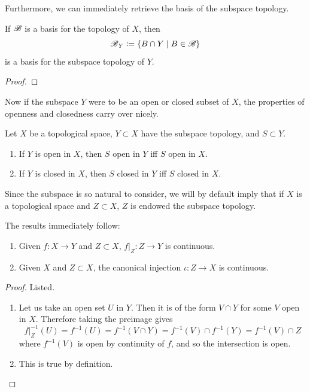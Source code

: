   Furthermore, we can immediately retrieve the basis of the subspace topology. 

  \begin{theorem}
    If $\B$ is a basis for the topology of $X$, then 
    \begin{equation}
      \B_Y \coloneqq \{B \cap Y \mid B \in \B \} 
    \end{equation}
    is a basis for the subspace topology of $Y$. 
  \end{theorem}
  \begin{proof}
    
  \end{proof} 

  Now if the subspace $Y$ were to be an open or closed subset of $X$, the properties of openness and closedness carry over nicely. 

  \begin{lemma}
    Let $X$ be a topological space, $Y \subset X$ have the subspace topology, and $S \subset Y$. 
    \begin{enumerate}
      \item If $Y$ is open in $X$, then $S$ open in $Y$ iff $S$ open in $X$. 
      \item If $Y$ is closed in $X$, then $S$ closed in $Y$ iff $S$ closed in $X$. 
    \end{enumerate}
  \end{lemma}

  Since the subspace is so natural to consider, we will by default imply that if $X$ is a topological space and $Z \subset X$, $Z$ is endowed the subspace topology. 

  \begin{lemma}
    The results immediately follow: 
    \begin{enumerate}
      \item Given $f: X \rightarrow Y$ and $Z \subset X$, $f|_{Z} : Z \rightarrow Y$ is continuous. 
      \item Given $X$ and $Z \subset X$, the canonical injection $\iota: Z \rightarrow X$ is continuous. 
    \end{enumerate}
  \end{lemma}
  \begin{proof}
    Listed. 
    \begin{enumerate}
      \item Let us take an open set $U$ in $Y$. Then it is of the form $V \cap Y$ for some $V$ open in $X$. Therefore taking the preimage gives 
      \begin{equation}
        f|_{Z}^{-1} (U) = f^{-1} (U) = f^{-1} (V \cap Y) = f^{-1} (V) \cap f^{-1} (Y) = f^{-1} (V) \cap Z
      \end{equation}
      where $f^{-1} (V)$ is open by continuity of $f$, and so the intersection is open. 

      \item This is true by definition. 
    \end{enumerate}
  \end{proof}

